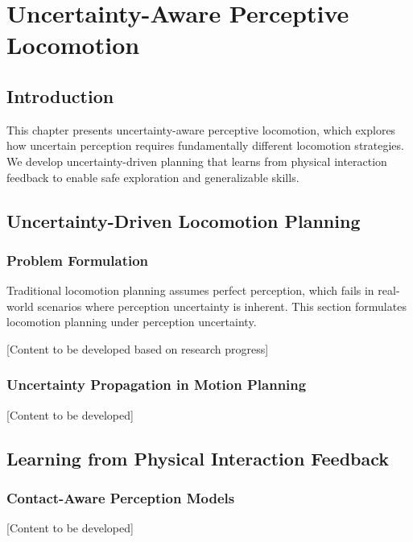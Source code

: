 \chapter{Uncertainty-Aware Perceptive Locomotion} \label{chapter:IMU_tokenizer}

\section{Introduction}

This chapter presents uncertainty-aware perceptive locomotion, which explores how uncertain perception requires fundamentally different locomotion strategies. We develop uncertainty-driven planning that learns from physical interaction feedback to enable safe exploration and generalizable skills.

\section{Uncertainty-Driven Locomotion Planning}

\subsection{Problem Formulation}

Traditional locomotion planning assumes perfect perception, which fails in real-world scenarios where perception uncertainty is inherent. This section formulates locomotion planning under perception uncertainty.

[Content to be developed based on research progress]

\subsection{Uncertainty Propagation in Motion Planning}

[Content to be developed]

\section{Learning from Physical Interaction Feedback}

\subsection{Contact-Aware Perception Models}

[Content to be developed]

